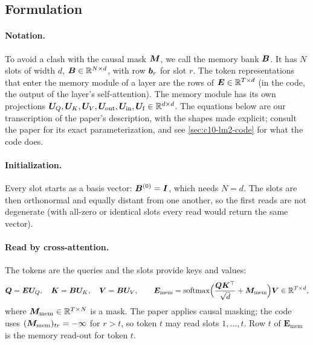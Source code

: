 \subsection{Formulation}

\paragraph{Notation.} To avoid a clash with the causal mask $\bm{M}$, we call the memory bank $\bm{B}$.
It has $N$ slots of width $d$, $\bm{B} \in \mathbb{R}^{N \times d}$, with row $\bm{b}_r$ for slot $r$. The
token representations that enter the memory module of a layer are the rows of
$\bm{E} \in \mathbb{R}^{T \times d}$ (in the code, the output of the layer's self-attention). The memory
module has its own projections $\bm{U}_Q, \bm{U}_K, \bm{U}_V, \bm{U}_{\mathrm{out}}, \bm{U}_{\mathrm{in}},
\bm{U}_{\mathrm{f}} \in \mathbb{R}^{d \times d}$. The equations below are our transcription of the paper's
description, with the shapes made explicit; consult the paper for its exact parameterization, and
see \cref{sec:c10-lm2-code} for what the code does.

\paragraph{Initialization.} Every slot starts as a basis vector: $\bm{B}^{(0)} = \bm{I}$, which needs
$N = d$. The slots are then orthonormal and equally distant from one another, so the first reads
are not degenerate (with all-zero or identical slots every read would return the same vector).

\paragraph{Read by cross-attention.} The tokens are the queries and the slots provide keys and
values:
\begin{equation}
  \bm{Q} = \bm{E}\bm{U}_Q,\quad \bm{K} = \bm{B}\bm{U}_K,\quad \bm{V} = \bm{B}\bm{U}_V,\qquad
  \bm{E}_{\mathrm{mem}} = \operatorname{softmax}\Bigl(\frac{\bm{Q}\bm{K}^{\top}}{\sqrt{d}} + \bm{M}_{\mathrm{mem}}\Bigr)\bm{V}
  \in \mathbb{R}^{T\times d},
  \label{eq:c10-lm2-read}
\end{equation}
where $\bm{M}_{\mathrm{mem}} \in \mathbb{R}^{T \times N}$ is a mask. The paper applies causal masking; the code
uses $(\bm{M}_{\mathrm{mem}})_{tr} = -\infty$ for $r > t$, so token $t$ may read slots $1,\dots,t$.
Row $t$ of $\bm{E}_{\mathrm{mem}}$ is the memory read-out for token $t$.

